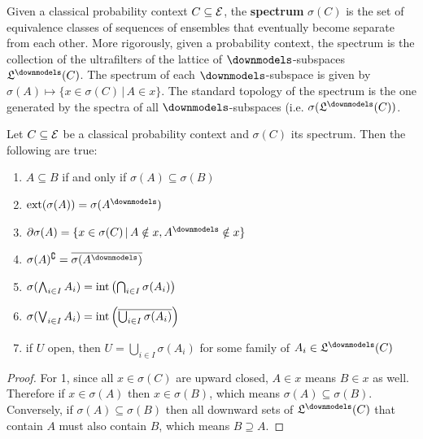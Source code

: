 \begin{mathSection}
\begin{defn}
	Given a classical probability context $C \subseteq \mathcal{E}$, the \textbf{spectrum} $\sigma(C)$ is the set of equivalence classes of sequences of ensembles that eventually become separate from each other. More rigorously, given a probability context, the spectrum is the collection of the ultrafilters of the lattice of $\separate$-subspaces $\mathfrak{L}^\separate(C)$. The spectrum of each $\separate$-subspace is given by $\sigma(A) \mapsto \{ x \in \sigma(C) \, | \, A \in x \}$. The standard topology of the spectrum is the one generated by the spectra of all $\separate$-subspaces (i.e. $\sigma(\mathfrak{L}^\separate(C))$.
\end{defn}

\begin{prop}
	Let $C \subseteq \mathcal{E}$ be a classical probability context and $\sigma(C)$ its spectrum. Then the following are true:
	\begin{enumerate}
		\item $A \subseteq B$ if and only if $\sigma(A) \subseteq \sigma(B)$
		\item $\exterior(\sigma(A)) = \sigma(A^{\separate})$
		\item $\partial \sigma(A) = \{ x \in \sigma(C) \, | \, A \notin x, A^{\separate} \notin x \}$
		\item $\sigma(A)^{\complement} = \overline{\sigma(A^{\separate})}$
		\item $\sigma(\bigwedge_{i \in I} A_i) = \operatorname{int}\left(\bigcap_{i \in I} \sigma(A_i)\right)$
		\item $\sigma(\bigvee_{i \in I} A_i) = \operatorname{int}\left(\overline{\bigcup_{i \in I} \sigma(A_i)}\right)$
		\item if $U$ open, then $U = \bigcup_{i \in I} \sigma(A_i)$ for some family of $A_i \in \mathfrak{L}^\separate(C)$
	\end{enumerate}
\end{prop}

\begin{proof}
	For 1, since all $x \in \sigma(C)$ are upward closed, $A \in x$ means $B \in x$ as well. Therefore if $x \in \sigma(A)$ then $x \in \sigma(B)$, which means $\sigma(A) \subseteq \sigma(B)$. Conversely, if $\sigma(A) \subseteq \sigma(B)$ then all downward sets of $\mathfrak{L}^\separate(C)$ that contain $A$ must also contain $B$, which means $B \supseteq A$.
	

\end{proof}
\end{mathSection}
